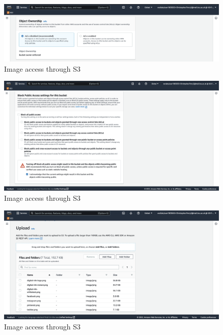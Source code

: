 \begin{figure}
    \centering
    \includegraphics[width=\textwidth]{resources/s3/s3-object-ownership.png}
    \caption{Image access through S3}
    \label{fig:s3-object-ownership}
\end{figure}


\begin{figure}
    \centering
    \includegraphics[width=\textwidth]{resources/s3/s3-public-access.png}
    \caption{Image access through S3}
    \label{fig:s3-public-access}
\end{figure}


\begin{figure}
    \centering
    \includegraphics[width=\textwidth]{resources/s3/s3-upload-summary.png}
    \caption{Image access through S3}
    \label{fig:s3-upload-summary}
\end{figure}


